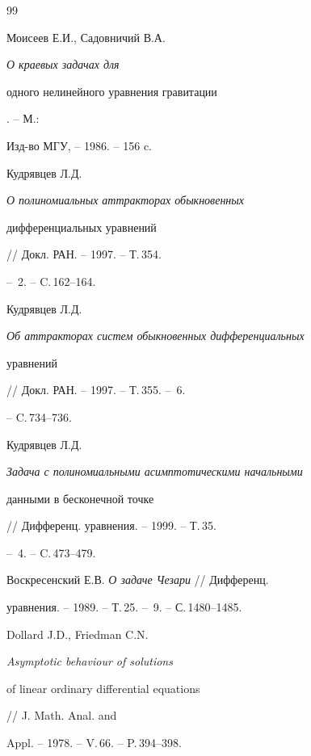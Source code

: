 \begin{thebibliography}{99}










Моисеев Е.И., Садовничий В.А. {\em О краевых задачах для


одного нелинейного уравнения гравитации}. -- М.:


Изд-во МГУ, -- 1986. -- 156 c.







Кудрявцев Л.Д. {\em О полиномиальных аттракторах обыкновенных


дифференциальных уравнений} // Докл. РАН. -- 1997. -- Т.\,354.


-- \No\,2. -- C.\,162--164.







Кудрявцев Л.Д. {\em Об аттракторах систем обыкновенных дифференциальных


уравнений} // Докл. РАН. -- 1997. -- Т.\,355. -- \No\,6.


-- C.\,734--736.







Кудрявцев Л.Д. {\em Задача с полиномиальными асимптотическими начальными


данными в бесконечной точке} // Дифференц. уравнения. -- 1999. -- Т.\,35.


-- \No\,4. -- C.\,473--479.







Воскресенский Е.В. {\em О задаче Чезари} // Дифференц.


уравнения. -- 1989. -- Т.\,25. -- \No\,9. -- С.\,1480--1485.







Dollard J.D., Friedman C.N. {\em Asymptotic behaviour of solutions


of linear ordinary differential equations} // J. Math. Anal. and


Appl. -- 1978. -- V.\,66. -- P.\,394--398.






\end{thebibliography}
